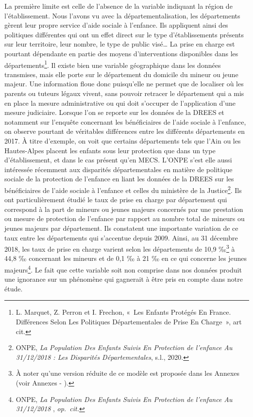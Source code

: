 \documentclass[
  12,
  a4paper,
]{report}
\begin{document}
La première limite est celle de l'absence de la variable indiquant la
région de l'établissement. Nous l'avons vu avec la départementalisation,
les départements gèrent leur propre service d'aide sociale à l'enfance.
Ils appliquent ainsi des politiques différentes qui ont un effet direct
sur le type d'établissements présents sur leur territoire, leur nombre,
le type de public visé\ldots{} La prise en charge est pourtant
dépendante en partie des moyens d'interventions disponibles dans les
départements\footnote{L. Marquet, Z. Perron et I. Frechon, {«~Les
  Enfants Protégés En {France}. {Différences} Selon Les Politiques
  Départementales de Prise En Charge~»}, art cit.}. Il existe bien une
variable géographique dans les données transmises, mais elle porte sur
le département du domicile du mineur ou jeune majeur. Une information
floue donc puisqu'elle ne permet que de localiser où les parents ou
tuteurs légaux vivent, sans pouvoir retracer le département qui a mis en
place la mesure administrative ou qui doit s'occuper de l'application
d'une mesure judiciaire. Lorsque l'on se reporte sur les données de la
DREES et notamment sur l'enquête concernant les bénéficiaires de l'aide
sociale à l'enfance, on observe pourtant de véritables différences entre
les différents départements en 2017. À titre d'exemple, on voit que
certains départements tels que l'Ain ou les Hautes-Alpes placent les
enfants sous leur protection que dans un type d'établissement, et dans
le cas présent qu'en MECS. L'ONPE s'est elle aussi intéressée récemment
aux disparités départementales en matière de politique sociale de la
protection de l'enfance en liant les données de la DREES sur les
bénéficiaires de l'aide sociale à l'enfance et celles du ministère de la
Justice\footnote{ONPE, \emph{La Population Des Enfants Suivis En
  Protection de l'enfance Au 31/12/2018 : Les Disparités
  Départementales}, s.l., 2020.}. Ils ont particulièrement étudié le
taux de prise en charge par département qui correspond à la part de
mineurs ou jeunes majeurs concernés par une prestation ou mesure de
protection de l'enfance par rapport au nombre total de mineurs ou jeunes
majeurs par département. Ils constatent une importante variation de ce
taux entre les départements qui s'accentue depuis 2009. Ainsi, au 31
décembre 2018, les taux de prise en charge varient selon les
départements de 10,9 ‰\footnote{À noter qu'une version réduite de ce
  modèle est proposée dans les Annexes (voir Annexes - ).} à 44,8 ‰
concernant les mineurs et de 0,1 ‰ à 21 ‰ en ce qui concerne les jeunes
majeurs\footnote{ONPE, \emph{La Population Des Enfants Suivis En
  Protection de l'enfance Au 31/12/2018 }, \emph{op.~cit.}}. Le fait que
cette variable soit non comprise dans nos données produit une ignorance
sur un phénomène qui gagnerait à être pris en compte dans notre étude.
\end{document}
